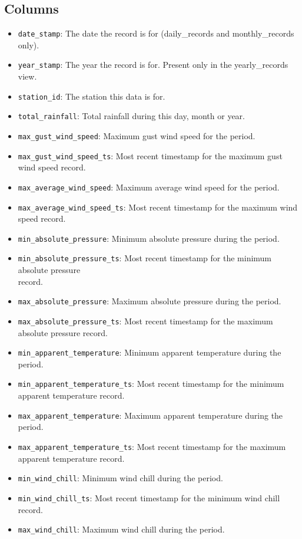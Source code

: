 \documentclass[a4paper,10pt]{book}
\begin{document}
\subsection{Columns}
\begin{itemize}
\item \verb|date_stamp|: The date the record is for (daily\_records and monthly\_records only).
\item \verb|year_stamp|: The year the record is for. Present only in the yearly\_records view.
\item \verb|station_id|: The station this data is for.
\item \verb|total_rainfall|: Total rainfall during this day, month or year.
\item \verb|max_gust_wind_speed|: Maximum gust wind speed for the period.
\item \verb|max_gust_wind_speed_ts|: Most recent timestamp for the maximum gust wind speed record.
\item \verb|max_average_wind_speed|: Maximum average wind speed for the period.
\item \verb|max_average_wind_speed_ts|: Most recent timestamp for the maximum wind speed record.
\item \verb|min_absolute_pressure|: Minimum absolute pressure during the period.
\item \verb|min_absolute_pressure_ts|: Most recent timestamp for the minimum absolute pressure \\ record.
\item \verb|max_absolute_pressure|: Maximum absolute pressure during the period.
\item \verb|max_absolute_pressure_ts|: Most recent timestamp for the maximum absolute pressure record.
\item \verb|min_apparent_temperature|: Minimum apparent temperature during the period.
\item \verb|min_apparent_temperature_ts|: Most recent timestamp for the minimum apparent temperature record.
\item \verb|max_apparent_temperature|: Maximum apparent temperature during the period.
\item \verb|max_apparent_temperature_ts|: Most recent timestamp for the maximum apparent temperature record.
\item \verb|min_wind_chill|: Minimum wind chill during the period.
\item \verb|min_wind_chill_ts|: Most recent timestamp for the minimum wind chill record.
\item \verb|max_wind_chill|: Maximum wind chill during the period.

\end{itemize}
\end{document}
